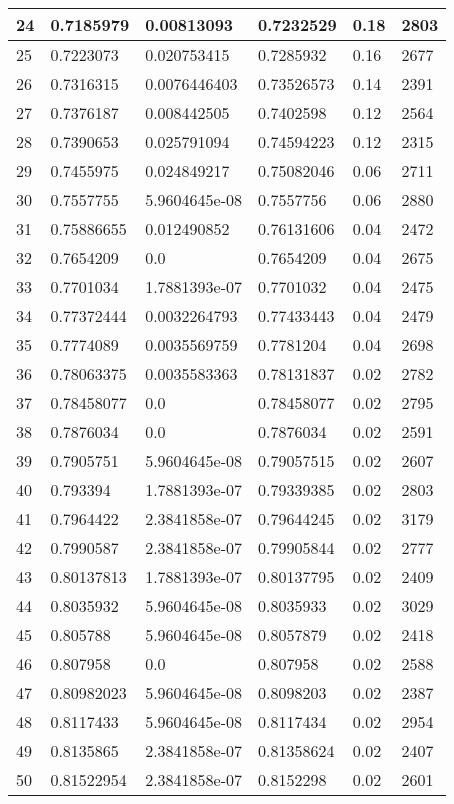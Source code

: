 \begin{longtable}{|l|l|l|l|l|l|}
24 & 0.7185979 & 0.00813093 & 0.7232529 & 0.18 & 2803 \\ \hline 
25 & 0.7223073 & 0.020753415 & 0.7285932 & 0.16 & 2677 \\ \hline 
26 & 0.7316315 & 0.0076446403 & 0.73526573 & 0.14 & 2391 \\ \hline 
27 & 0.7376187 & 0.008442505 & 0.7402598 & 0.12 & 2564 \\ \hline 
28 & 0.7390653 & 0.025791094 & 0.74594223 & 0.12 & 2315 \\ \hline 
29 & 0.7455975 & 0.024849217 & 0.75082046 & 0.06 & 2711 \\ \hline 
30 & 0.7557755 & 5.9604645e-08 & 0.7557756 & 0.06 & 2880 \\ \hline 
31 & 0.75886655 & 0.012490852 & 0.76131606 & 0.04 & 2472 \\ \hline 
32 & 0.7654209 & 0.0 & 0.7654209 & 0.04 & 2675 \\ \hline 
33 & 0.7701034 & 1.7881393e-07 & 0.7701032 & 0.04 & 2475 \\ \hline 
34 & 0.77372444 & 0.0032264793 & 0.77433443 & 0.04 & 2479 \\ \hline 
35 & 0.7774089 & 0.0035569759 & 0.7781204 & 0.04 & 2698 \\ \hline 
36 & 0.78063375 & 0.0035583363 & 0.78131837 & 0.02 & 2782 \\ \hline 
37 & 0.78458077 & 0.0 & 0.78458077 & 0.02 & 2795 \\ \hline 
38 & 0.7876034 & 0.0 & 0.7876034 & 0.02 & 2591 \\ \hline 
39 & 0.7905751 & 5.9604645e-08 & 0.79057515 & 0.02 & 2607 \\ \hline 
40 & 0.793394 & 1.7881393e-07 & 0.79339385 & 0.02 & 2803 \\ \hline 
41 & 0.7964422 & 2.3841858e-07 & 0.79644245 & 0.02 & 3179 \\ \hline 
42 & 0.7990587 & 2.3841858e-07 & 0.79905844 & 0.02 & 2777 \\ \hline 
43 & 0.80137813 & 1.7881393e-07 & 0.80137795 & 0.02 & 2409 \\ \hline 
44 & 0.8035932 & 5.9604645e-08 & 0.8035933 & 0.02 & 3029 \\ \hline 
45 & 0.805788 & 5.9604645e-08 & 0.8057879 & 0.02 & 2418 \\ \hline 
46 & 0.807958 & 0.0 & 0.807958 & 0.02 & 2588 \\ \hline 
47 & 0.80982023 & 5.9604645e-08 & 0.8098203 & 0.02 & 2387 \\ \hline 
48 & 0.8117433 & 5.9604645e-08 & 0.8117434 & 0.02 & 2954 \\ \hline 
49 & 0.8135865 & 2.3841858e-07 & 0.81358624 & 0.02 & 2407 \\ \hline 
50 & 0.81522954 & 2.3841858e-07 & 0.8152298 & 0.02 & 2601 \\ \hline 
\end{longtable}